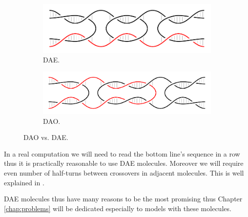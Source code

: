 		\begin{figure}[h]
		\begin{center}
			\begin{subfigure}[b]{0.433\textwidth} %
				\includegraphics[width=\textwidth]{./figures/dao-dae/dae.pdf}
				\caption{DAE.}
				\label{fig:dao}
			\end{subfigure}
			\begin{subfigure}[b]{0.5\textwidth} %
				\includegraphics[width=\textwidth]{./figures/dao-dae/dao.pdf}
				\caption{DAO.}
				\label{fig:dae}
			\end{subfigure}
			\caption{DAO vs. DAE.}
			\label{fig:dao-dae}
		\end{center}
		\end{figure}
		
		In a real computation we will need to read the bottom line's sequence in a row thus it is practically reasonable to use DAE molecules. Moreover we will require even number of half-turns between crossovers in adjacent molecules. This is well explained in \cite[p.37]{winfree_phd}.
		
		DAE molecules thus have many reasons to be the most promising thus Chapter \ref{chap:problems} will be dedicated especially to models with these molecules.